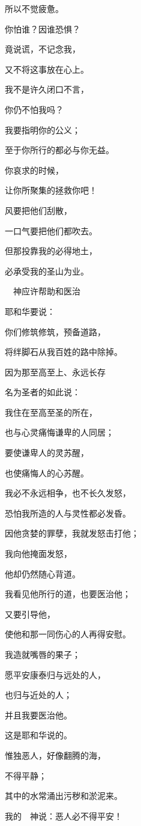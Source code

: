 {\par }{\Q 所以不觉疲惫。
\par }{\BB \par }{\Q {}你怕谁？因谁恐惧？
\par }{\Q 竟说谎，不记念我，
\par }{\Q 又不将这事放在心上。
\par }{\Q 我不是许久闭口不言，
\par }{\Q 你仍不怕我吗？
\par }{\Q {}我要指明你的公义；
\par }{\Q 至于你所行的都必与你无益。
\par }{\Q {}你哀求的时候，
\par }{\Q 让你所聚集的拯救你吧！
\par }{\Q 风要把他们刮散，
\par }{\Q 一口气要把他们都吹去。
\par }{\Q 但那投靠我的必得地土，
\par }{\Q 必承受我的圣山为业。
\par }{\SH 　神应许帮助和医治
\par }{\Q {}耶和华要说：
\par }{\Q 你们修筑修筑，预备道路，
\par }{\Q 将绊脚石从我百姓的路中除掉。
\par }{\Q {}因为那至高至上、永远长存
\par }{\Q 名为圣者的如此说：
\par }{\Q 我住在至高至圣的所在，
\par }{\Q 也与心灵痛悔谦卑的人同居；
\par }{\Q 要使谦卑人的灵苏醒，
\par }{\Q 也使痛悔人的心苏醒。
\par }{\Q {}我必不永远相争，也不长久发怒，
\par }{\Q 恐怕我所造的人与灵性都必发昏。
\par }{\Q {}因他贪婪的罪孽，我就发怒击打他；
\par }{\Q 我向他掩面发怒，
\par }{\Q 他却仍然随心背道。
\par }{\Q {}我看见他所行的道，也要医治他；
\par }{\Q 又要引导他，
\par }{\Q 使他和那一同伤心的人再得安慰。
\par }{\Q {}我造就嘴唇的果子；
\par }{\Q 愿平安康泰归与远处的人，
\par }{\Q 也归与近处的人；
\par }{\Q 并且我要医治他。
\par }{\Q 这是耶和华说的。
\par }{\Q {}惟独恶人，好像翻腾的海，
\par }{\Q 不得平静；
\par }{\Q 其中的水常涌出污秽和淤泥来。
\par }{\Q {}我的　神说：恶人必不得平安！

}
